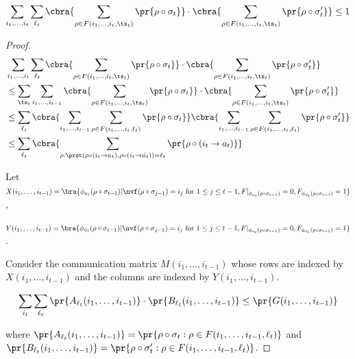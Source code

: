 \begin{claim}
    $$\sum_{i_1, \ldots , i_t} \sum_{\ell_t} 
        \cbra{\sum_{\rho \in F(i_1, \ldots , i_t, \ts_t)} \pr{\rho \circ \sigma_t}} \cdot \cbra{\sum_{\rho \in F(i_1, \ldots , i_t, \ts_t)} \pr{\rho \circ \sigma_t'}} \leq 1$$
\end{claim}
\begin{proof}
\begin{align*}
    &\sum_{i_1, \ldots , i_t} \sum_{\ell_t} 
        \cbra{\sum_{\rho \in F(i_1, \ldots , i_t, \ts_t)} \pr{\rho \circ \sigma_t}} \cdot \cbra{\sum_{\rho \in F(i_1, \ldots , i_t, \ts_t)} \pr{\rho \circ \sigma_t'}} \\
        &\leq \sum_{\ts_t} \sum_{i_1,\ldots ,i_{t-1}} \cbra{\sum_{\rho \in F(i_1, \ldots , i_t, \ts_t)} \pr{\rho \circ \sigma_t}} \cdot \cbra{\sum_{\rho \in F(i_1, \ldots , i_t, \ts_t)} \pr{\rho \circ \sigma_t'}}\\
        &\leq \sum_{\ell_t} \cbra{\sum_{i_1, \ldots ,i_{t-1}} \sum_{\rho \in F(i_1,\ldots ,i_t,\ell_t)} \pr{\rho \circ \sigma_t}} \cbra{\sum_{i_1, \ldots ,i_{t-1}}\sum_{\rho \in F(i_1,\ldots ,i_t,\ell_t)} \pr{\rho \circ \sigma_t'}}\\
        &\leq \sum_{\ell_t} \cbra{\sum_{\rho: \prot(\rho \circ (i_t \to a_t), \rho\circ (i_t \to \bar{a_t})) = \ell_t} \pr{\rho \circ (i_t \to a_t)}}
\end{align*}




Let $X(i_1, \ldots , i_{t-1}) = \bra{\phi_{a_t}(\rho \circ \sigma_{t-1})| \nvf(\rho \circ \sigma_{j-1}) = i_j \text{ for } 1 \leq j \leq t-1, F|_{\phi_{a_t}(\rho \circ \sigma_{t-1})} = 0 , F_{\phi_{\bar{a_t}}(\rho \circ \sigma_{t-1})}=1} $,

$Y(i_1, \ldots , i_{t-1}) = \bra{\phi_{\bar{a_t}}(\rho \circ \sigma_{t-1})| \nvf(\rho \circ \sigma_{j-1}) = i_j \text{ for } 1 \leq j \leq t-1, F|_{\phi_{a_t}(\rho \circ \sigma_{t-1})} = 0 , F_{\phi_{\bar{a_t}}(\rho \circ \sigma_{t-1})}=1} $. 

Consider the communication matrix $M(i_1, \ldots , i_{t-1})$ whose rows are indexed by $X(i_1, \ldots , i_{t-1})$ and the columns are indexed by $Y(i_1, \ldots , i_{t-1})$.  

    $$\sum_{i_t} \sum_{\ell_t} \pr{A_{\ell_t}(i_1, \ldots ,i_{t-1})} \cdot \pr{B_{\ell_t}(i_1, \ldots ,i_{t-1})}
    \leq \pr{G(i_1, \ldots , i_{t-1})}$$
    
    where 
    $\pr{A_{\ell_t}(i_1, \ldots, i_{t-1})} = \pr{\rho \circ \sigma_t: \rho \in F(i_1, \ldots , i_{t-1}, \ell_t)}$
    and\\
    $\pr{B_{\ell_t}(i_1, \ldots, i_{t-1})} = \pr{\rho \circ \sigma_t': \rho \in F(i_1, \ldots , i_{t-1}, \ell_t)}$.
    

\end{proof}
